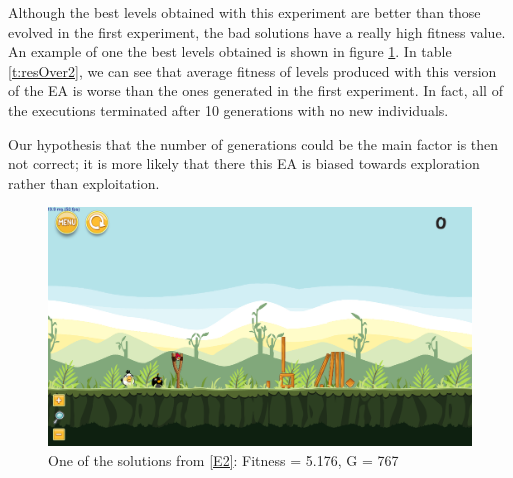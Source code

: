 \documentclass[sigconf]{acmart}
\begin{document}
Although the best levels obtained with this experiment are better than those 
evolved in the first experiment, the bad solutions have a really high fitness 
value. An example of one the best levels obtained is shown in figure 
\ref{f:e2-4}.
In table \ref{t:resOver2}, we can see that average fitness of levels 
produced with this version of the EA is worse than the ones generated in the 
first experiment. In fact, all of the executions terminated after 10 generations with no new individuals.

Our hypothesis that the number of generations could be the main factor
is then not correct; it is more likely that there this EA is biased towards 
exploration rather than exploitation. 
\begin{figure}
	\centering
	\includegraphics[scale=0.2]{level-0-base_large180529_223045.png}
	\caption{One of the solutions from \ref{E2}: Fitness = 5.176, G = 767  
	}\label{f:e2-4}
\end{figure}
\end{document}
